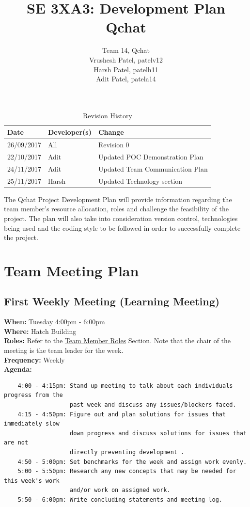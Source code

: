 \documentclass{article}
\title{SE 3XA3: Development Plan\\Qchat}
\author{Team 14, Qchat
		\\ Vrushesh Patel, patelv12
		\\ Harsh Patel, patelh11
		\\ Adit Patel, patela14
}
\date{}
\begin{document}
\maketitle

\newpage

\tableofcontents

\begin{table}[hp]
\caption{Revision History} \label{TblRevisionHistory}
\begin{tabularx}{\textwidth}{llX}
\toprule
\textbf{Date} & \textbf{Developer(s)} & \textbf{Change}\\
\midrule
26/09/2017 & All & Revision 0\\
22/10/2017 & Adit & Updated POC Demonstration Plan \\
24/11/2017 & Adit & Updated Team Communication Plan\\
25/11/2017 & Harsh & Updated Technology section \\
\bottomrule
\end{tabularx}
\end{table}

\newpage 

The Qchat Project Development Plan will provide information regarding the team member's resource allocation, roles and challenge the feasibility of the project. The plan will also take into consideration version control, technologies being used and the coding style to be followed in order to successfully complete the project. 

\section{Team Meeting Plan}
\subsection{First Weekly Meeting (Learning Meeting)}
\textbf{When:} Tuesday 4:00pm - 6:00pm\\
\textbf{Where:} Hatch Building \\
\textbf{Roles:} Refer to the \hyperref[TeamMemberRoles]{Team Member Roles} Section. Note that the chair of the meeting is the team leader for the week. \\ 
\textbf{Frequency:} Weekly\\
\textbf{Agenda:} 
\begin{verbatim}
    4:00 - 4:15pm: Stand up meeting to talk about each individuals progress from the
                   past week and discuss any issues/blockers faced. 
    4:15 - 4:50pm: Figure out and plan solutions for issues that immediately slow  
                   down progress and discuss solutions for issues that are not 
                   directly preventing development . 
    4:50 - 5:00pm: Set benchmarks for the week and assign work evenly. 
    5:00 - 5:50pm: Research any new concepts that may be needed for this week's work
                   and/or work on assigned work. 
    5:50 - 6:00pm: Write concluding statements and meeting log.
\end{verbatim}
\end{document}

